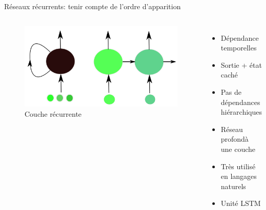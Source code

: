 \documentclass{beamer}
\begin{document}
\begin{frame}{Réseaux récurrents: tenir compte de l'ordre d'apparition}
  \begin{columns}
    \begin{figure}
      \centering
      \includegraphics[scale=0.15]{../Figures/Recurrent}
      \caption{Couche récurrente}
    \end{figure}

    \begin{itemize}
    \item Dépendance temporelles\pause
    \item Sortie + état caché\pause
    \item Pas de dépendances hiérarchiques\pause
    \item Réseau \og profond\fg à une couche \pause
    \item Très utilisé en langages naturels\pause
    \item Unité LSTM
    \end{itemize}
  \end{columns}
\end{frame}
\end{document}
